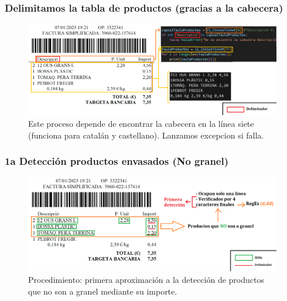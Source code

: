 \documentclass{beamer}
\begin{document}
	
	\begin{frame}	
		\frametitle{Delimitamos la tabla de productos (gracias a la cabecera)}
		\begin{figure}
			\centering
			\includegraphics[width=1\linewidth]{imgEspecifiques/ticketExtraccioN0}
			\caption{Este proceso depende de encontrar la cabecera en la línea siete (funciona para catalán y castellano). Lanzamos excepcion si falla.}
			\label{fig:ticketextraccionN0}
		\end{figure}
	\end{frame}
	
	
	
	
	
	
		\begin{frame}	
			\frametitle{1a Detección productos envasados (No granel)}
			\begin{figure}
				\centering
				\includegraphics[width=1\linewidth]{imgEspecifiques/ticketExtraccioN1}
				\caption{Procedimiento: primera aproximación a la detección de productos que no son a granel mediante su importe.}
				\label{fig:ticketextraccionN1}
			\end{figure}
		\end{frame}
		
\end{document}
